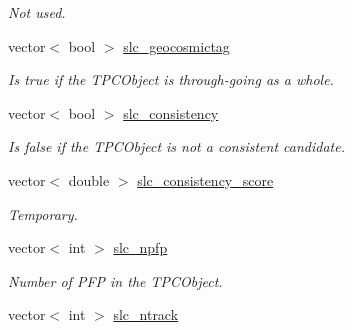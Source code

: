\begin{DoxyCompactItemize}
\begin{DoxyCompactList}\small\item\em Not used. \end{DoxyCompactList}\item 
\hypertarget{classUBXSecEvent_a5bf2adbb96dee74effb2efb02ca73ca6}{vector$<$ bool $>$ \hyperlink{classUBXSecEvent_a5bf2adbb96dee74effb2efb02ca73ca6}{slc\-\_\-geocosmictag}}\label{classUBXSecEvent_a5bf2adbb96dee74effb2efb02ca73ca6}

\begin{DoxyCompactList}\small\item\em Is true if the T\-P\-C\-Object is through-\/going as a whole. \end{DoxyCompactList}\item 
\hypertarget{classUBXSecEvent_a549ad5d4e82d19528f79d0074cd4a7d4}{vector$<$ bool $>$ \hyperlink{classUBXSecEvent_a549ad5d4e82d19528f79d0074cd4a7d4}{slc\-\_\-consistency}}\label{classUBXSecEvent_a549ad5d4e82d19528f79d0074cd4a7d4}

\begin{DoxyCompactList}\small\item\em Is false if the T\-P\-C\-Object is not a consistent candidate. \end{DoxyCompactList}\item 
\hypertarget{classUBXSecEvent_af7293625860342c3e57b02da4cacf863}{vector$<$ double $>$ \hyperlink{classUBXSecEvent_af7293625860342c3e57b02da4cacf863}{slc\-\_\-consistency\-\_\-score}}\label{classUBXSecEvent_af7293625860342c3e57b02da4cacf863}

\begin{DoxyCompactList}\small\item\em Temporary. \end{DoxyCompactList}\item 
\hypertarget{classUBXSecEvent_a9e7b76e3075ee41f14cb93f895a28281}{vector$<$ int $>$ \hyperlink{classUBXSecEvent_a9e7b76e3075ee41f14cb93f895a28281}{slc\-\_\-npfp}}\label{classUBXSecEvent_a9e7b76e3075ee41f14cb93f895a28281}

\begin{DoxyCompactList}\small\item\em Number of P\-F\-P in the T\-P\-C\-Object. \end{DoxyCompactList}\item 
\hypertarget{classUBXSecEvent_a536003dadab39e399dcfc6aebea8cd17}{vector$<$ int $>$ \hyperlink{classUBXSecEvent_a536003dadab39e399dcfc6aebea8cd17}{slc\-\_\-ntrack}}\label{classUBXSecEvent_a536003dadab39e399dcfc6aebea8cd17}


\end{DoxyCompactItemize}

